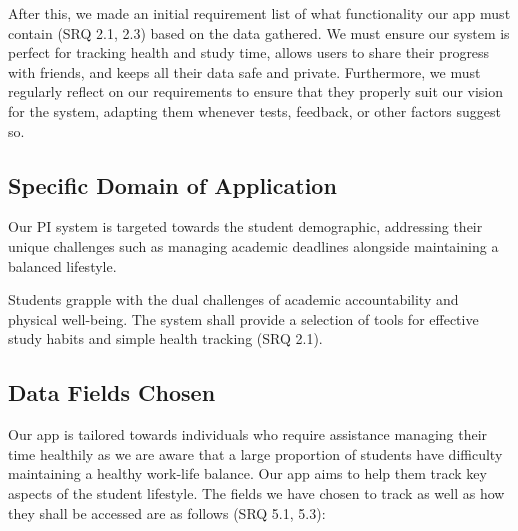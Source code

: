 \documentclass[11pt]{article}
\begin{document}
After this, we made an initial requirement list of what functionality our app must contain (SRQ 2.1, 2.3)
based on the data gathered. We must ensure our system is perfect for tracking
health and study time, allows users to share their progress with friends, and
keeps all their data safe and private. Furthermore, we must regularly reflect on our requirements
to ensure that they properly suit our vision for the system, adapting them whenever tests, feedback, or other factors suggest so.
 

\subsection{Specific Domain of Application}

Our PI system is targeted towards the student demographic,
addressing their unique challenges such as managing academic deadlines
alongside maintaining a balanced lifestyle.\par 

Students grapple with the dual challenges of academic accountability and
physical well-being. The system shall provide a selection of tools for effective
study habits and simple health tracking (SRQ 2.1).
 

\subsection{Data Fields Chosen}

Our app is tailored towards individuals who require assistance managing their time healthily as
we are aware that a large proportion of students have difficulty maintaining a healthy work-life
balance. Our app aims to help them track key aspects of the student lifestyle.
The fields we have chosen to track as well as how they shall be accessed are as follows (SRQ 5.1, 5.3):
\end{document}
